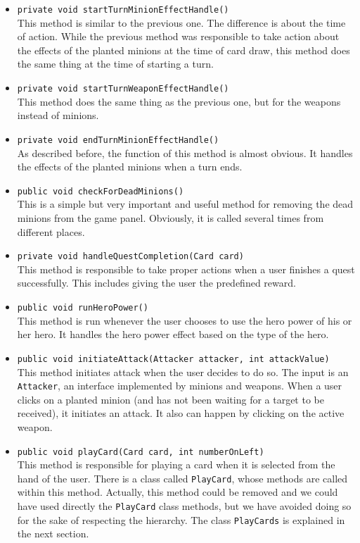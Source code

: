 \documentclass[a4paper]{article}
\begin{document}
\begin{itemize}
	\item \texttt{private void startTurnMinionEffectHandle()}\\
	This method is similar to the previous one. The difference is about the time of action. While the previous method was responsible to take action about the effects of the planted minions at the time of card draw, this method does the same thing at the time of starting a turn.
	
	\item \texttt{private void startTurnWeaponEffectHandle()}\\
	This method does the same thing as the previous one, but for the weapons instead of minions.
	
	\item \texttt{private void endTurnMinionEffectHandle()}\\
	As described before, the function of this method is almost obvious. It handles the effects of the planted minions when a turn ends.
	
	\item \texttt{public void checkForDeadMinions()}\\
	This is a simple but very important and useful method for removing the dead minions from the game panel. Obviously, it is called several times from different places.
	
	\item \texttt{private void handleQuestCompletion(Card card)}\\
	This method is responsible to take proper actions when a user finishes a quest successfully. This includes giving the user the predefined reward.
	
	\item \texttt{public void runHeroPower()}\\
	This method is run whenever the user chooses to use the hero power of his or her hero. It handles the hero power effect based on the type of the hero.
	
	\item \texttt{public void initiateAttack(Attacker attacker, int attackValue)}\\
	This method initiates attack when the user decides to do so. The input is an \texttt{Attacker}, an interface implemented by minions and weapons. When a user clicks on a planted minion (and has not been waiting for a target to be received), it initiates an attack. It also can happen by clicking on the active weapon.
	
	\item \texttt{public void playCard(Card card, int numberOnLeft)}\\
	This method is responsible for playing a card when it is selected from the hand of the user. There is a class called \texttt{PlayCard}, whose methods are called within this method. Actually, this method could be removed and we could have used directly the \texttt{PlayCard} class methods, but we have avoided doing so for the sake of respecting the hierarchy. The class \texttt{PlayCards} is explained in the next section.
	
\end{itemize}
\end{document}
